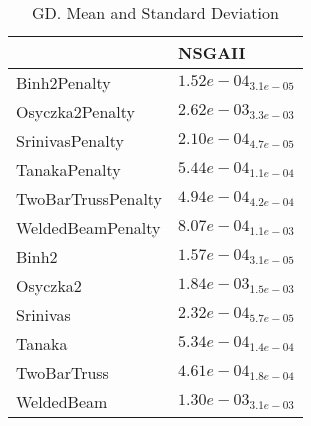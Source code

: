 \documentclass{article}
\begin{document}
\begin{table}
\caption{GD. Mean and Standard Deviation}
\label{table: GD}
\centering
\begin{scriptsize}
\begin{tabular}{ll}
\hline &  NSGAII\\
\hline 
Binh2Penalty & \cellcolor{gray95}$  1.52e-04_{ 3.1e-05}$ \\
Osyczka2Penalty & \cellcolor{gray95}$  2.62e-03_{ 3.3e-03}$ \\
SrinivasPenalty & \cellcolor{gray95}$  2.10e-04_{ 4.7e-05}$ \\
TanakaPenalty & \cellcolor{gray95}$  5.44e-04_{ 1.1e-04}$ \\
TwoBarTrussPenalty & \cellcolor{gray95}$  4.94e-04_{ 4.2e-04}$ \\
WeldedBeamPenalty & \cellcolor{gray95}$  8.07e-04_{ 1.1e-03}$ \\
Binh2 & \cellcolor{gray95}$  1.57e-04_{ 3.1e-05}$ \\
Osyczka2 & \cellcolor{gray95}$  1.84e-03_{ 1.5e-03}$ \\
Srinivas & \cellcolor{gray95}$  2.32e-04_{ 5.7e-05}$ \\
Tanaka & \cellcolor{gray95}$  5.34e-04_{ 1.4e-04}$ \\
TwoBarTruss & \cellcolor{gray95}$  4.61e-04_{ 1.8e-04}$ \\
WeldedBeam & \cellcolor{gray95}$  1.30e-03_{ 3.1e-03}$ \\
\hline
\end{tabular}
\end{scriptsize}
\end{table}
\end{document}

